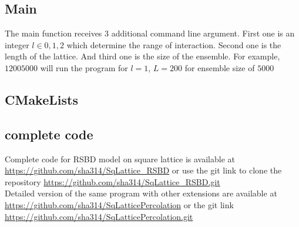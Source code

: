 	\subsection{Main}
	The main function receives 3 additional command line argument. First one is an integer $l\in{0,1,2}$ which determine the range of interaction. Second one is the length of the lattice. And third one is the size of the ensemble. For example, $1 200 5000$ will run the program for $l=1$, $L=200$ for ensemble size of $5000$
	
	
	\subsection{CMakeLists}
	
	
	\subsection{complete code}
	Complete code for RSBD model on square lattice is available at
	\url{https://github.com/sha314/SqLattice_RSBD}
	or use the git link to clone the repository
	\url{https://github.com/sha314/SqLattice_RSBD.git}
	\\
	Detailed version of the same program with other extensions are available at
	\url{https://github.com/sha314/SqLatticePercolation}
	or the git link
	\url{https://github.com/sha314/SqLatticePercolation.git}



